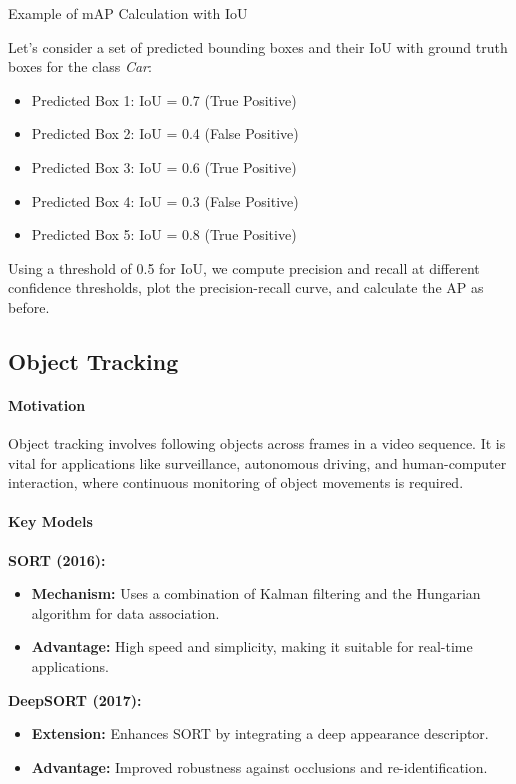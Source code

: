 \documentclass[12pt]{article}
\begin{document}
Example of mAP Calculation with IoU

Let's consider a set of predicted bounding boxes and their IoU with ground truth boxes for the class \textit{Car}:

\begin{itemize}
  \item Predicted Box 1: IoU = 0.7 (True Positive)
  \item Predicted Box 2: IoU = 0.4 (False Positive)
  \item Predicted Box 3: IoU = 0.6 (True Positive)
  \item Predicted Box 4: IoU = 0.3 (False Positive)
  \item Predicted Box 5: IoU = 0.8 (True Positive)
\end{itemize}

Using a threshold of 0.5 for IoU, we compute precision and recall at different confidence thresholds, plot the precision-recall curve, and calculate the AP as before.

\subsection{Object Tracking}

\paragraph{Motivation}
Object tracking involves following objects across frames in a video sequence. It is vital for applications like surveillance, autonomous driving, and human-computer interaction, where continuous monitoring of object movements is required.

\paragraph{Key Models}

\textbf{SORT (2016):}
\begin{itemize}
    \item \textbf{Mechanism:} Uses a combination of Kalman filtering and the Hungarian algorithm for data association.
    \item \textbf{Advantage:} High speed and simplicity, making it suitable for real-time applications.
\end{itemize}

\textbf{DeepSORT (2017):}
\begin{itemize}
    \item \textbf{Extension:} Enhances SORT by integrating a deep appearance descriptor.
    \item \textbf{Advantage:} Improved robustness against occlusions and re-identification.
\end{itemize}
\end{document}

